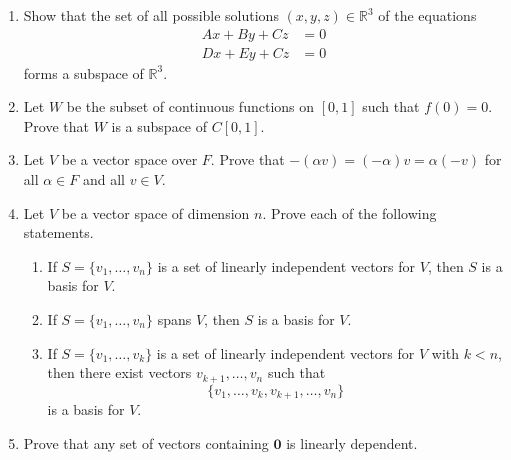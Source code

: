 {\begin{enumerate}
\begin{enumerate}
  \item
$\{ (x_1, x_2, x_3) : 3 x_1 + 4 x_3 = 0, 2 x_1 - x_2 + x_3 = 0 \}$

  \item
$\{ (x_1, x_2, x_3) : x_1 - 2 x_2 + 2 x_3 = 2 \}$

  \item
$\{ (x_1, x_2, x_3) : 3 x_1 - 2 x_2^2 = 0 \}$

\end{enumerate}


\item
Show that the set of all possible solutions $(x, y, z) \in {\mathbb R}^3$
of the equations
\begin{align*}
Ax + B y + C z & =  0 \\
D x + E y + C z & =  0
\end{align*}
forms a subspace of ${\mathbb R}^3$.


\item
Let $W$ be the subset of continuous functions on $[0, 1]$ such that
$f(0) = 0$.  Prove that $W$ is a subspace of $C[0, 1]$.




\item
Let $V$ be a vector space over $F$. Prove that $-(\alpha v) =
(-\alpha)v = \alpha(-v)$ for all $\alpha \in F$ and all $v \in V$. 


\item
Let $V$ be a vector space of dimension $n$. Prove each of the
following statements. 
\begin{enumerate}

 \item
If $S = \{v_1, \ldots, v_n \}$ is a set of linearly independent
vectors for $V$, then $S$ is a basis for $V$. 

 \item
If $S = \{v_1, \ldots, v_n \}$ spans $V$, then $S$ is a basis for $V$.

 \item 
If $S = \{v_1, \ldots, v_k \}$ is a set of linearly independent
vectors for $V$ with $k < n$, then there exist vectors $v_{k+1},
\ldots, v_n$ such that 
\[
\{v_1, \ldots, v_k, v_{k+1}, \ldots, v_n \}
\] 
is a basis for $V$. 

\end{enumerate}


\item
Prove that any set of vectors containing ${\mathbf 0}$ is linearly
dependent. 



\end{enumerate}}

